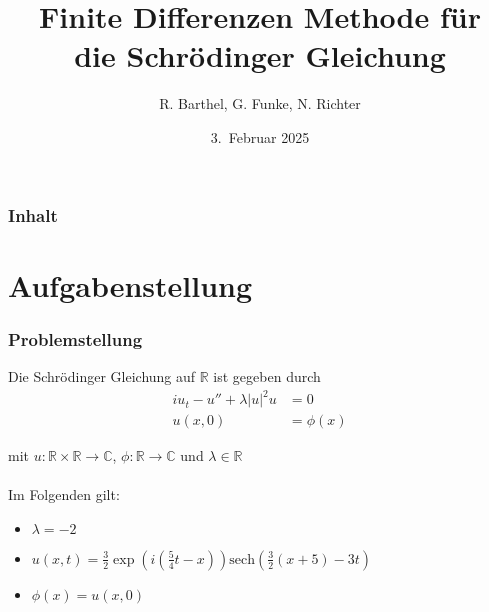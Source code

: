 \documentclass{beamer}
\author[Barthel, Funke, Richter]{R. Barthel, G. Funke, N. Richter}
\title[Finite Differenzen Methode f\"ur die Schr\"odinger Gleichung]{Finite Differenzen Methode f\"ur\\ die Schr\"odinger Gleichung}
\institute[Numerik-Praktikum 24/25]{Numerisches Praktikum\\
                    WS 2024/2025\\
                      Universit\"at Leipzig}
\date[WS 2025]{3.\ Februar 2025}
\begin{document}
\frame{\titlepage}

\begin{frame}
\frametitle{Inhalt}
\tableofcontents
\end{frame}

\section{Aufgabenstellung}

\begin{frame}
    \frametitle{Problemstellung}

    Die Schrödinger Gleichung auf $\mathbb{R}$ ist gegeben durch
    \begin{align*}
        iu_t - u'' + \lambda |u|^2u &= 0 \\
        u(x,0) &= \phi(x)
    \end{align*}
    
    mit $u:\mathbb{R}\times\mathbb{R}\to\mathbb{C}$, $\phi:\mathbb{R}\to\mathbb{C}$ und $\lambda\in\mathbb{R}$\\
    \ \\
    Im Folgenden gilt:
    \begin{itemize}
        \item $\lambda = -2$
        \item $u(x,t)=\frac{3}{2}\exp(i(\frac{5}{4}t-x))\text{sech}(\frac{3}{2}(x+5)-3t)$
        \item $\phi(x)=u(x,0)$
    \end{itemize}
\end{frame}

\end{document}

